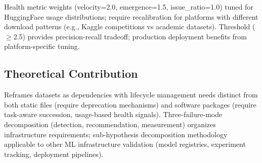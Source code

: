 Health metric weights (velocity=2.0, emergence=1.5, issue\_ratio=1.0) tuned for HuggingFace usage distributions; require recalibration for platforms with different download patterns (e.g., Kaggle competitions vs academic datasets). Threshold ($\geq$2.5) provides precision-recall tradeoff; production deployment benefits from platform-specific tuning.

\subsection{Theoretical Contribution}

Reframes datasets as dependencies with lifecycle management needs distinct from both static files (require deprecation mechanisms) and software packages (require task-aware succession, usage-based health signals). Three-failure-mode decomposition (detection, recommendation, measurement) organizes infrastructure requirements; sub-hypothesis decomposition methodology applicable to other ML infrastructure validation (model registries, experiment tracking, deployment pipelines).
